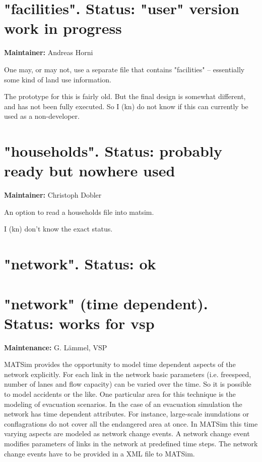 \section{"facilities". Status: "user" version work in progress}

\textbf{Maintainer:} Andreas Horni

One may, or may not, use a separate file that contains "facilities" – essentially some kind of land use information.

The prototype for this is fairly old. But the final design is  somewhat different, and has not been fully executed. So I (kn) do  not know if this can currently be used as a non-developer.

\umbruch
\section{"households". Status: probably ready but nowhere used}

\textbf{Maintainer:} Christoph Dobler

An option to read a households file into matsim.

I (kn) don't know the exact status.

\umbruch
\section{"network". Status: ok}

\umbruch
\section{"network" (time dependent). Status: works for vsp}

\textbf{Maintenance:} G. Lämmel, VSP

MATSim provides the opportunity to model time dependent aspects of  the network explicitly. For each link in the network basic parameters  (i.e. freespeed, number of lanes and flow capacity) can be varied over  the time. So it is possible to model accidents or the like. One  particular area for this technique is the modeling of evacuation  scenarios.
In the case of an evacuation simulation the network has time dependent  attributes. For instance, large-scale inundations or conflagrations do  not cover all the endangered area at once.
In MATSim this time varying aspects are modeled as network change  events. A network change event modifies parameters of links in the  network at predefined time steps. The network change events have to be  provided in a XML file to MATSim.

